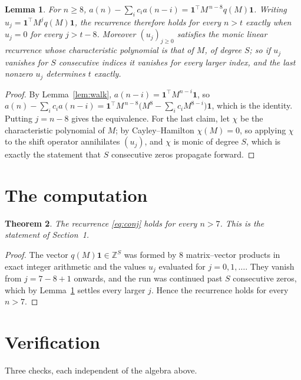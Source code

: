 \documentclass[11pt,a4paper]{article}
\theoremstyle{plain}
\newtheorem{theorem}{Theorem}
\newtheorem{lemma}[theorem]{Lemma}
\theoremstyle{definition}
\begin{document}
\begin{lemma}\label{lem:crit}
For $n\ge8$,
$a(n)-\sum_i c_i a(n-i)=\mathbf{1}^{\!\top}M^{\,n-8}q(M)\mathbf{1}$. Writing
$u_j=\mathbf{1}^{\!\top}M^{j}q(M)\mathbf{1}$, the recurrence therefore holds for every
$n>t$ exactly when $u_j=0$ for every $j>t-8$. Moreover $(u_j)_{j\ge0}$ satisfies the
monic linear recurrence whose characteristic polynomial is that of $M$, of degree $S$; so
if $u_j$ vanishes for $S$ consecutive indices it vanishes for every larger index, and the
last nonzero $u_j$ determines $t$ exactly.
\end{lemma}

\begin{proof}
By Lemma~\ref{lem:walk}, $a(n-i)=\mathbf{1}^{\!\top}M^{n-i}\mathbf{1}$, so
$a(n)-\sum_i c_i a(n-i)
=\mathbf{1}^{\!\top}M^{\,n-8}\bigl(M^{8}-\sum_i c_i M^{8-i}\bigr)
\mathbf{1}$, which is the identity. Putting $j=n-8$ gives the equivalence. For the
last claim, let $\chi$ be the characteristic polynomial of $M$; by Cayley--Hamilton
$\chi(M)=0$, so applying $\chi$ to the shift operator annihilates $(u_j)$, and $\chi$ is
monic of degree $S$, which is exactly the statement that $S$ consecutive zeros propagate
forward.
\end{proof}

\section{The computation}

\begin{theorem}
The recurrence \eqref{eq:conj} holds for every $n>7$. This is the statement of
Section~1.
\end{theorem}

\begin{proof}
The vector $q(M)\mathbf{1}\in\mathbb{Z}^{S}$ was formed by $8$ matrix--vector
products in exact integer arithmetic and the values $u_j$ evaluated for
$j=0,1,\dots$. They vanish from $j=7-8+1$ onwards, and the run was continued past
$S$ consecutive zeros, which by Lemma~\ref{lem:crit} settles every larger $j$. Hence the
recurrence holds for every $n>7$.
\end{proof}

\section{Verification}

Three checks, each independent of the algebra above.
\end{document}
